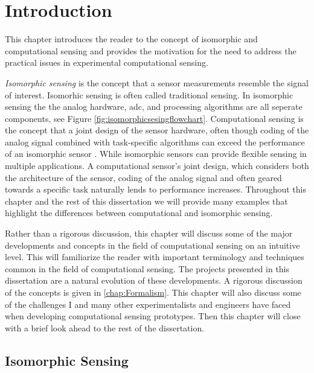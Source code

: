

\chapter{Introduction}


This chapter introduces the reader to the concept of isomorphic and computational sensing and provides the motivation for the need to address the practical issues in experimental computational sensing. 

\emph{Isomorphic sensing} is the concept that a sensor measurements resemble the signal of interest. Isomorhic sensing is often called traditional sensing. In isomorphic sensing the the analog hardware, \gls{adc}, and processing algorithms are all seperate components, see Figure \ref{fig:isomorphicsesingflowchart}. Computational sensing is the concept that a joint design of the sensor hardware, often though coding of the analog signal combined with task-specific algorithms can exceed the performance of an isomorphic sensor \cite{neifeld2006taskSpecificSensing}. While isomorphic sensors can provide flexible sensing in multiple applications. A computational sensor's joint design, which considers both the architecture of the sensor, coding of the analog signal and often geared towards a specific task naturally lends to performance increases. Throughout this chapter and the rest of this dissertation we will provide many examples that highlight the differences between computational and isomorphic sensing. 

Rather than a rigorous discussion, this chapter will discuss some of the major developments and concepts in the field of computational sensing on an intuitive level. This will familiarize the reader with important terminology and techniques common in the field of computational sensing. The projects presented in this dissertation are a natural evolution of these developments. A rigorous discussion of the concepts is given in \autoref{chap:Formalism}. This chapter will also discuss some of the challenges I and many other experimentalists and engineers have faced when developing computational sensing prototypes. Then this chapter will close with a brief look ahead to the rest of the dissertation. 


\section{Isomorphic Sensing}


